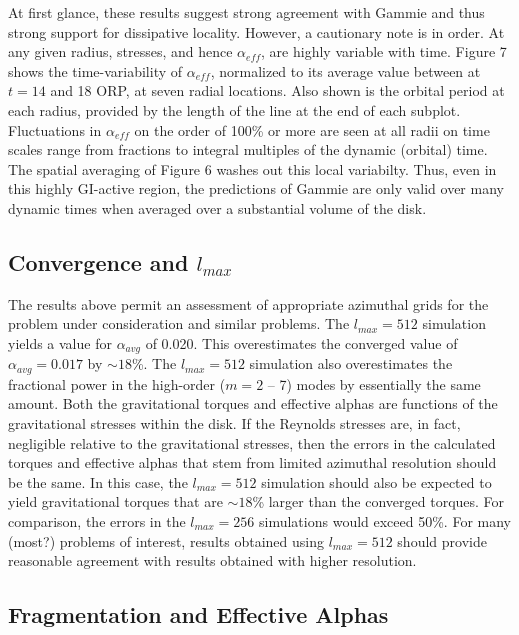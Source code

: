 \documentclass[manuscript]{aastex}
\begin{document}
At first glance, these results suggest strong agreement with Gammie and thus strong support for dissipative
locality.  However, a cautionary note is in order.  At any given radius, 
stresses, and hence $\alpha_{eff}$, are highly variable with time.
Figure 7 shows the time-variability of $\alpha_{eff}$, 
normalized to its average value between at $t = 14$ and 18 ORP, at seven radial locations.   
Also shown is the orbital period at each radius, provided by the length of the line at the end of each subplot. 
Fluctuations in $\alpha_{eff}$
on the order of 100\% or more are seen at all radii
on  time scales range from fractions to integral multiples of the dynamic (orbital) time.  The spatial averaging
of Figure 6 washes out this local variabilty.
Thus,
even in this highly GI-active region, the predictions of Gammie are only valid over many dynamic times 
when averaged over a substantial volume of the disk.

\subsection{Convergence and $l_{max}$}

The results above permit an assessment of appropriate azimuthal grids for the
problem under consideration and similar problems.  The $l_{max} = 512$ simulation yields a value 
for $\alpha_{avg}$ of 0.020.  This  overestimates the converged value of $\alpha_{avg}
= 0.017$ by $\sim 18$\%.  The $l_{max} = 512$ simulation also overestimates the fractional
power in the high-order ($m = 2$ -- 7) modes by essentially the same amount.
Both the gravitational torques and effective alphas are functions of the
gravitational stresses within the disk.  If the Reynolds stresses are, in fact, negligible relative to the gravitational stresses,
then the errors in the calculated torques and effective alphas that stem from limited azimuthal resolution 
should be the same.   In this case, the  $l_{max} = 512$ simulation should also be expected to yield
gravitational torques that are $\sim 18$\% larger than the converged torques.  For comparison, the
errors in the $l_{max} = 256$ simulations would exceed 50\%.   For many (most?) problems of interest,
results obtained using $l_{max} = 512$ should provide reasonable agreement with results obtained 
with higher resolution.

\subsection{Fragmentation and Effective Alphas}
\end{document}
